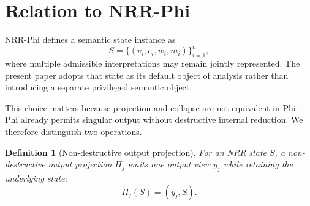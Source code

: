 \documentclass[11pt,a4paper]{article}
\newtheorem{definition}{Definition}
\begin{document}
\section{Relation to NRR-Phi}
\label{sec:phi}

NRR-Phi \cite{saito2026phi} defines a semantic state instance as
\begin{equation}
S = \{(v_i, c_i, w_i, m_i)\}_{i=1}^{n},
\end{equation}
where multiple admissible interpretations may remain jointly represented. The present paper adopts that state as its default object of analysis rather than introducing a separate privileged semantic object.

This choice matters because projection and collapse are not equivalent in Phi. Phi already permits singular output without destructive internal reduction. We therefore distinguish two operations.

\begin{definition}[Non-destructive output projection]
For an NRR state $S$, a non-destructive output projection $\Pi_j$ emits one output view $y_j$ while retaining the underlying state:
\begin{equation}
\Pi_j(S) = (y_j, S).
\end{equation}
\end{definition}
\end{document}
